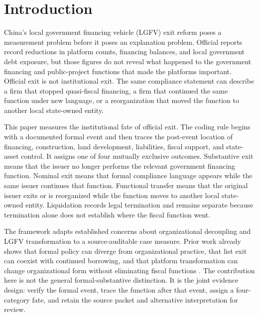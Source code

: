 \section{Introduction}

China's local government financing vehicle (LGFV) exit reform poses a
measurement problem before it poses an explanation problem. Official reports
record reductions in platform counts, financing balances, and local government
debt exposure, but those figures do not reveal what happened to the government
financing and public-project functions that made the platforms important.
Official exit is not institutional exit. The same compliance statement can
describe a firm that stopped quasi-fiscal financing, a firm that continued the
same function under new language, or a reorganization that moved the function
to another local state-owned entity.

This paper measures the institutional fate of official exit. The coding rule
begins with a documented formal event and then traces the post-event location
of financing, construction, land development, liabilities, fiscal support, and
state-asset control. It assigns one of four mutually exclusive outcomes.
Substantive exit means that the issuer no longer performs the relevant
government financing function. Nominal exit means that formal compliance
language appears while the same issuer continues that function. Functional
transfer means that the original issuer exits or is reorganized while the
function moves to another local state-owned entity. Liquidation records legal
termination and remains separate because termination alone does not establish
where the fiscal function went.

The framework adapts established concerns about organizational decoupling and
LGFV transformation to a source-auditable case measure. Prior work already
shows that formal policy can diverge from organizational practice, that list
exit can coexist with continued borrowing, and that platform transformation can
change organizational form without eliminating fiscal functions
\citep{bromley_powell_2012_decoupling,zhelyazkova_kaya_schrama_2016_compliance,
fang_lu_2024_classified_regulation,li_feng_hao_2022_lgfp_transformation,
feng_wu_zhang_2022_jiaxing}. The contribution here is not the general
formal-substantive distinction. It is the joint evidence design: verify the
formal event, trace the function after that event, assign a four-category fate,
and retain the source packet and alternative interpretation for review.

